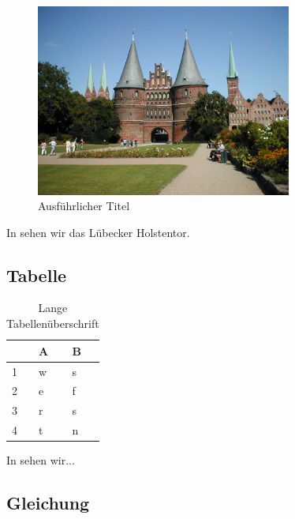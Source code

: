 \documentclass[
	ngerman,
	11pt,
	twoside,
	a4paper,
	headsepline,
	footsepline, 
	toc=bib
]{scrbook}
\begin{document}
\begin{figure}[htbp]
	\begin{center}
		\includegraphics[width=0.75\textwidth]{images/LuebeckHolstentor}
		\caption[Kurzfassung für Abbildungsverzeichnis]{Ausführlicher Titel}
		\label{fig:Holstentor}
		\end{center}
\end{figure}

In  sehen wir das  Lübecker Holstentor.

\subsection{Tabelle}

\begin{table}
\centering
\footnotesize
\caption[Kurze Tabellenüberschrift]{Lange Tabellenüberschrift}
\label{tab:eins}
\begin{tabular}{p{1.4cm} p{2.0cm} p{2.0cm}}\toprule
			& A 			& B 		\\[0.1cm]\midrule
	1		& w				& s 		\\[0.2cm]
	2 		& e				& f			\\[0.2cm]
	3		& r				& s			\\[0.2cm]
	4 		& t				& n 		\\\bottomrule
\end{tabular}
\end{table}

In  sehen wir...

\subsection{Gleichung}
\end{document}

